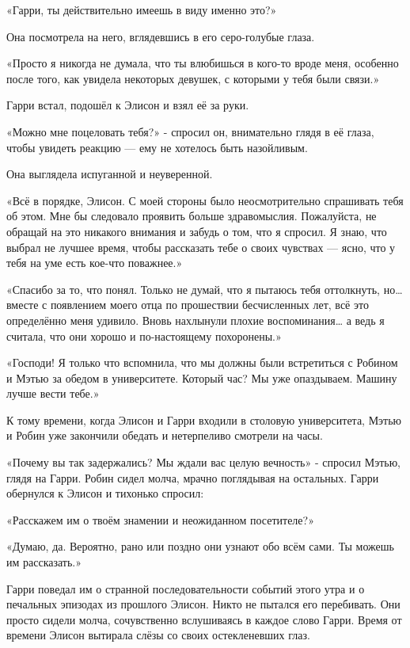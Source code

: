 \documentclass[a4paper,12pt]{book}
\begin{document}
«Гарри, ты действительно имеешь в виду именно это?»
\par
Она посмотрела на него, вглядевшись в его серо-голубые глаза.
\par
«Просто я никогда не думала, что ты влюбишься в кого-то вроде меня, особенно после того, как увидела некоторых девушек, с которыми у тебя были связи.»
\par
Гарри встал, подошёл к Элисон и взял её за руки.
\par
«Можно мне поцеловать тебя?» - спросил он, внимательно глядя в её глаза, чтобы увидеть реакцию — ему не хотелось быть назойливым.
\par
Она выглядела испуганной и неуверенной.
\par
«Всё в порядке, Элисон. С моей стороны было неосмотрительно спрашивать тебя об этом. Мне бы следовало проявить больше здравомыслия. Пожалуйста, не обращай на это никакого внимания и забудь о том, что я спросил. Я знаю, что выбрал не лучшее время, чтобы рассказать тебе о своих чувствах — ясно, что у тебя на уме есть кое-что поважнее.»
\par
«Спасибо за то, что понял. Только не думай, что я пытаюсь тебя оттолкнуть, но… вместе с появлением моего отца по прошествии бесчисленных лет, всё это определённо меня удивило. Вновь нахлынули плохие воспоминания… а ведь я считала, что они хорошо и по-настоящему похоронены.»
\par
«Господи! Я только что вспомнила, что мы должны были встретиться с Робином и Мэтью за обедом в университете. Который час? Мы уже опаздываем. Машину лучше вести тебе.»\\
\par
К тому времени, когда Элисон и Гарри входили в столовую университета, Мэтью и Робин уже закончили обедать и нетерпеливо смотрели на часы.
\par
«Почему вы так задержались? Мы ждали вас целую вечность» - спросил Мэтью, глядя на Гарри. Робин сидел молча, мрачно поглядывая на остальных. Гарри обернулся к Элисон и тихонько спросил:
\par
«Расскажем им о твоём знамении и неожиданном посетителе?»
\par
«Думаю, да. Вероятно, рано или поздно они узнают обо всём сами. Ты можешь им рассказать.»
\par
Гарри поведал им о странной последовательности событий этого утра и о печальных эпизодах из прошлого Элисон. Никто не пытался его перебивать. Они просто сидели молча, сочувственно вслушиваясь в каждое слово Гарри. Время от времени Элисон вытирала слёзы со своих остекленевших глаз.
\end{document}
